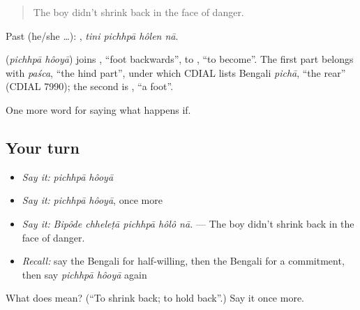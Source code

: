 \begin{quote}
The boy didn't shrink back in the face of danger.
\end{quote}

Past (he/she …):    , \emph{tini pichhpā hôlen nā}.

\begin{cousinweb}
\textbf{ } (\emph{pichhpā hôoyā}) joins , \textquotedblleft{}foot backwards\textquotedblright{}, to , \textquotedblleft{}to become\textquotedblright{}. The first part belongs with \emph{paśca}, \textquotedblleft{}the hind part\textquotedblright{}, under which CDIAL lists Bengali \emph{pichā}, \textquotedblleft{}the rear\textquotedblright{} (CDIAL 7990); the second is , \textquotedblleft{}a foot\textquotedblright{}.
\end{cousinweb}

\begin{grammarlens}[title={What you've built}]
One more word for saying what happens if.
\end{grammarlens}

\subsection*{Your turn}
\begin{itemize}
\raggedright
  \item \emph{Say it:} \emph{pichhpā hôoyā}
  \item \emph{Say it:} \emph{pichhpā hôoyā}, once more
  \item \emph{Say it:} \emph{Bipôde chheleṭā pichhpā hôlô nā.} — The boy didn't shrink back in the face of danger.
  \item \emph{Recall:} say the Bengali for half-willing, then the Bengali for a commitment, then say \emph{pichhpā hôoyā} again
\end{itemize}

\begin{tcolorbox}[breakable,colback=teal!4,colframe=teal!35!black,title={Before you move on}]
What does   mean? (\textquotedblleft{}To shrink back; to hold back\textquotedblright{}.) Say it once more.
\end{tcolorbox}
